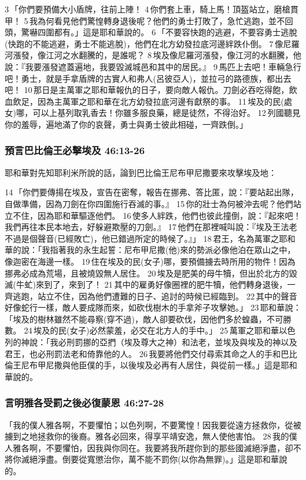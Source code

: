 3 「你們要預備大小盾牌，往前上陣！ 4 你們套上車，騎上馬！頂盔站立，磨槍貫甲！ 5 我為何看見他們驚惶轉身退後呢？他們的勇士打敗了，急忙逃跑，並不回頭，驚嚇四圍都有。」這是耶和華說的。 6 「不要容快跑的逃避，不要容勇士逃脫(快跑的不能逃避，勇士不能逃脫)，他們在北方幼發拉底河邊絆跌仆倒。 7 像尼羅河漲發，像江河之水翻騰的，是誰呢？ 8 埃及像尼羅河漲發，像江河的水翻騰，他說：『我要漲發遮蓋遍地，我要毀滅城邑和其中的居民。』 9 馬匹上去吧！車輛急行吧！勇士，就是手拿盾牌的古實人和弗人(呂彼亞人)，並拉弓的路德族，都出去吧！ 10 那日是主萬軍之耶和華報仇的日子，要向敵人報仇。刀劍必吞吃得飽，飲血飲足，因為主萬軍之耶和華在北方幼發拉底河邊有獻祭的事。 11 埃及的民(處女)哪，可以上基列取乳香去！你雖多服良藥，總是徒然，不得治好。 12 列國聽見你的羞辱，遍地滿了你的哀聲，勇士與勇士彼此相碰，一齊跌倒。」

\subsubsection{預言巴比倫王必擊埃及 46:13-26}
耶和華對先知耶利米所說的話，論到巴比倫王尼布甲尼撒要來攻擊埃及地：

14 「你們要傳揚在埃及，宣告在密奪，報告在挪弗、答比匿，說：『要站起出隊，自做準備，因為刀劍在你四圍施行吞滅的事。』 15 你的壯士為何被沖去呢？他們站立不住，因為耶和華驅逐他們。 16 使多人絆跌，他們也彼此撞倒，說：『起來吧！我們再往本民本地去，好躲避欺壓的刀劍。』 17 他們在那裡喊叫說：『埃及王法老不過是個聲音(已經敗亡)，他已錯過所定的時候了。』」 18 君王，名為萬軍之耶和華的說：「我指著我的永生起誓：尼布甲尼撒(他)來的勢派必像他泊在眾山之中，像迦密在海邊一樣。 19 住在埃及的民(女子)哪，要預備擄去時所用的物件！因為挪弗必成為荒場，且被燒毀無人居住。 20 埃及是肥美的母牛犢，但出於北方的毀滅(牛虻)來到了，來到了！ 21 其中的雇勇好像圈裡的肥牛犢，他們轉身退後，一齊逃跑，站立不住，因為他們遭難的日子、追討的時候已經臨到。 22 其中的聲音好像蛇行一樣，敵人要成隊而來，如砍伐樹木的手拿斧子攻擊她。」 23 耶和華說：「埃及的樹林雖然不能尋察(穿不過)，敵人卻要砍伐，因他們多於蝗蟲，不可勝數。 24 埃及的民(女子)必然蒙羞，必交在北方人的手中。」 25 萬軍之耶和華以色列的神說：「我必刑罰挪的亞捫（埃及尊大之神）和法老，並埃及與埃及的神以及君王，也必刑罰法老和倚靠他的人。 26 我要將他們交付尋索其命之人的手和巴比倫王尼布甲尼撒與他臣僕的手，以後埃及必再有人居住，與從前一樣。」這是耶和華說的。

\subsubsection{言明雅各受罰之後必復蒙恩 46:27-28}
「我的僕人雅各啊，不要懼怕；以色列啊，不要驚惶！因我要從遠方拯救你，從被擄到之地拯救你的後裔。雅各必回來，得享平靖安逸，無人使他害怕。 28 我的僕人雅各啊，不要懼怕，因我與你同在。我要將我所趕你到的那些國滅絕淨盡，卻不將你滅絕淨盡。倒要從寬懲治你，萬不能不罰你(以你為無罪)。」這是耶和華說的。

